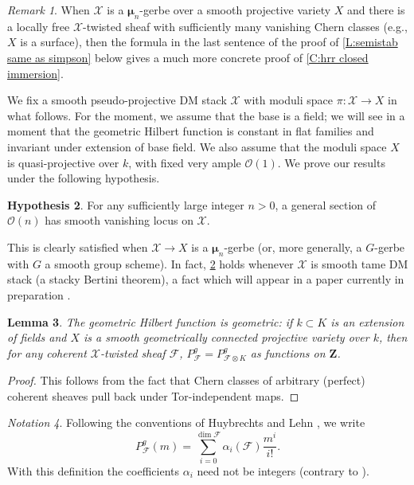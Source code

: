 \documentclass[11pt]{amsart}
\newcommand{\field}[1]{\mathbf #1}
\newcommand{\ms}[1]{\mathscr #1}
\newcommand{\Z}{\field Z}
\renewcommand{\O}{\ms O}
\newcommand{\m}{\boldsymbol{\mu}}
\renewcommand{\[}{[\!\hspace{0.03em}[}
\renewcommand{\]}{]\!\hspace{0.03em}]}
\renewcommand{\(}{(\!\hspace{0.03em}(}
\renewcommand{\)}{)\!\hspace{0.03em})}
\DeclareMathOperator*{\tensor}{\otimes}
\newtheorem{lem}{Lemma}[subsubsection]%
\theoremstyle{definition}
\newtheorem{hyp}[lem]{Hypothesis}
\theoremstyle{remark}
\newtheorem{remark}[lem]{Remark}
\newtheorem{notn}[lem]{Notation}
\newenvironment{rem}{\begin{remark}}{\nolinebreak{\hfill $\blacklozenge$} \end{remark}}
\begin{document}
\begin{rem} When $\ms X$ is a $\m_{n}$-gerbe over a smooth projective 
variety $X$ and there is a locally free $\ms X$-twisted sheaf with 
sufficiently many vanishing Chern classes (e.g., $X$ is a surface), 
then the formula in the last sentence of the proof of \ref{L:semistab 
same as simpson} below gives a much more concrete proof of \ref{C:hrr 
closed immersion}.
\end{rem}


We fix a smooth pseudo-projective DM stack $\ms X$ with moduli space 
$\pi:\ms X\to X$ in what follows.  For the moment, we assume that the base is a field; we will see in a moment that the geometric Hilbert function is constant in flat families and invariant under extension of base field.  We also assume that the moduli space $X$ is quasi-projective over $k$, with fixed very ample $\O(1)$.  We prove our results under the following hypothesis.

\begin{hyp}\label{H:vanishing} For any sufficiently large integer $n>0$, a general section of $\O(n)$ has smooth vanishing locus on $\ms X$.
\end{hyp}
This is clearly satisfied when $\ms X\to X$ is a $\m_n$-gerbe (or, more generally, a $G$-gerbe with $G$ a smooth group scheme).  In fact, \ref{H:vanishing} holds whenever $\ms X$ is smooth tame DM stack (a stacky Bertini theorem), a fact which will appear in a paper currently in preparation \cite{orbifoldmoduli}.

\begin{lem} The geometric Hilbert function is geometric: if $k\subset K$ is an 
extension of fields and $X$ is a smooth geometrically connected projective variety over $k$, then 
for any coherent $\ms X$-twisted sheaf $\ms F$, $P^{g}_{\ms F}=P^{g}_{\ms 
F\tensor K}$ as functions on $\Z$.
\end{lem}
\begin{proof} This follows from the fact that Chern classes of 
arbitrary (perfect) coherent sheaves pull back 
under Tor-independent maps.
\end{proof}

\begin{notn} Following the conventions of Huybrechts and Lehn 
\cite[\S1.2]{h-l}, we write 
    $$P^{g}_{\ms F}(m)=\sum_{i=0}^{\dim\ms F}\alpha_{i}(\ms 
    F)\frac{m^{i}}{i!}.$$
With this definition the coefficients $\alpha_{i}$ need not be 
integers (contrary to \cite[p.\ 10]{h-l}).  
\end{notn}
\end{document}
